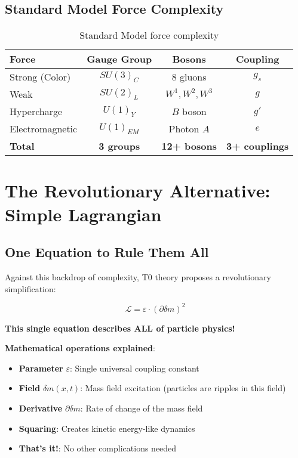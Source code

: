 \documentclass[12pt,a4paper]{article}
\newcommand{\Lag}{\mathcal{L}}
\newcommand{\deltam}{\delta m}
\theoremstyle{definition}
\theoremstyle{remark}
\begin{document}
	\subsection{Standard Model Force Complexity}
	
	\begin{table}[htbp]
		\centering
		\begin{tabular}{lccc}
			\toprule
			\textbf{Force} & \textbf{Gauge Group} & \textbf{Bosons} & \textbf{Coupling} \\
			\midrule
			Strong (Color) & $SU(3)_C$ & 8 gluons & $g_s$ \\
			Weak & $SU(2)_L$ & $W^1, W^2, W^3$ & $g$ \\
			Hypercharge & $U(1)_Y$ & $B$ boson & $g'$ \\
			Electromagnetic & $U(1)_{EM}$ & Photon $A$ & $e$ \\
			\midrule
			\textbf{Total} & \textbf{3 groups} & \textbf{12+ bosons} & \textbf{3+ couplings} \\
			\bottomrule
		\end{tabular}
		\caption{Standard Model force complexity}
		\label{tab:sm_force_complexity}
	\end{table}
	
	\section{The Revolutionary Alternative: Simple Lagrangian}
	
	\subsection{One Equation to Rule Them All}
	
	Against this backdrop of complexity, T0 theory proposes a revolutionary simplification:
	
	\begin{equation}
		\boxed{\Lag = \varepsilon \cdot (\partial \deltam)^2}
		\label{eq:revolutionary_lagrangian}
	\end{equation}
	
	\textbf{This single equation describes ALL of particle physics!}
	
	\textbf{Mathematical operations explained}:
	\begin{itemize}
		\item \textbf{Parameter} $\varepsilon$: Single universal coupling constant
		\item \textbf{Field} $\deltam(x,t)$: Mass field excitation (particles are ripples in this field)
		\item \textbf{Derivative} $\partial \deltam$: Rate of change of the mass field
		\item \textbf{Squaring}: Creates kinetic energy-like dynamics
		\item \textbf{That's it!}: No other complications needed
	\end{itemize}
	
\end{document}
